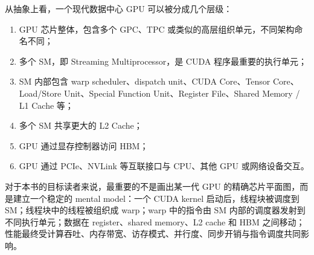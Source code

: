 从抽象上看，一个现代数据中心 GPU 可以被分成几个层级：

\begin{enumerate}
  \item GPU 芯片整体，包含多个 GPC、TPC 或类似的高层组织单元，不同架构命名不同；
  \item 多个 SM，即 Streaming Multiprocessor，是 CUDA 程序最重要的执行单元；
  \item SM 内部包含 warp scheduler、dispatch unit、CUDA Core、Tensor Core、Load/Store Unit、Special Function Unit、Register File、Shared Memory / L1 Cache 等；
  \item 多个 SM 共享更大的 L2 Cache；
  \item GPU 通过显存控制器访问 HBM；
  \item GPU 通过 PCIe、NVLink 等互联接口与 CPU、其他 GPU 或网络设备交互。
\end{enumerate}

对于本书的目标读者来说，最重要的不是画出某一代 GPU 的精确芯片平面图，而是建立一个稳定的 mental model：一个 CUDA kernel 启动后，线程块被调度到 SM；线程块中的线程被组织成 warp；warp 中的指令由 SM 内部的调度器发射到不同执行单元；数据在 register、shared memory、L2 cache 和 HBM 之间移动；性能最终受计算吞吐、内存带宽、访存模式、并行度、同步开销与指令调度共同影响。

